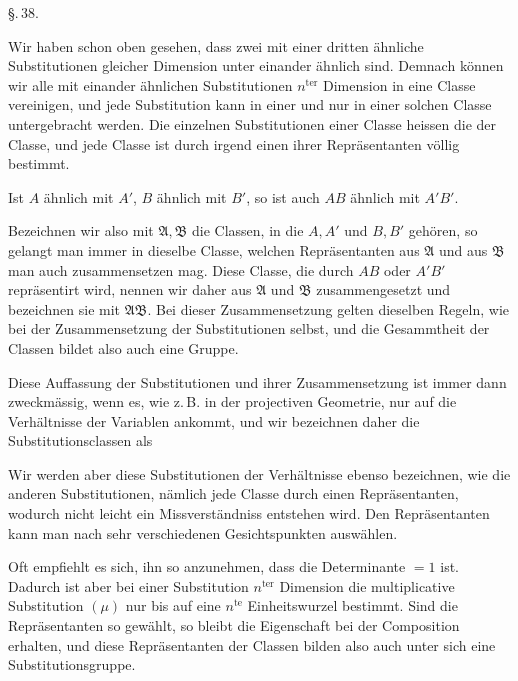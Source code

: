
\begin{center}
\S.\,38.

\end{center}

Wir haben schon oben gesehen, dass zwei mit einer dritten ähnliche Substitutionen gleicher Dimension unter einander ähnlich sind. Demnach können wir alle mit einander ähnlichen Substitutionen $n^{\mathrm{ter}}$ Dimension in eine Classe vereinigen, und jede Substitution kann in einer und nur in einer solchen Classe untergebracht werden. Die einzelnen Substitutionen einer Classe heissen die  der Classe, und jede Classe ist durch irgend einen ihrer Repräsentanten völlig bestimmt.

Ist $A$ ähnlich mit $A'$, $B$ ähnlich mit $B'$, so ist auch $AB$ ähnlich mit $A'B'$.

Bezeichnen wir also mit $\mathfrak{A}, \mathfrak{B}$ die Classen, in die $A, A'$ und $B, B'$ gehören, so gelangt man immer in dieselbe Classe, welchen Repräsentanten aus $\mathfrak{A}$ und aus $\mathfrak{B}$ man auch zusammensetzen mag. Diese Classe, die durch $AB$ oder $A'B'$ repräsentirt wird, nennen wir daher aus $\mathfrak{A}$ und $\mathfrak{B}$ zusammengesetzt und bezeichnen sie mit $\mathfrak{A}\mathfrak{B}$. Bei dieser Zusammensetzung gelten dieselben Regeln, wie bei der Zusammensetzung der Substitutionen selbst, und die Gesammtheit der Classen bildet also auch eine Gruppe.

Diese Auffassung der Substitutionen und ihrer Zusammensetzung ist immer dann zweckmässig, wenn es, wie z.\,B. in der projectiven Geometrie, nur auf die Verhältnisse der Variablen ankommt, und wir bezeichnen daher die Substitutionsclassen als 

Wir werden aber diese Substitutionen der Verhältnisse ebenso bezeichnen, wie die anderen Substitutionen, nämlich jede Classe durch einen Repräsentanten, wodurch nicht leicht ein Missverständniss entstehen wird. Den Repräsentanten kann man nach sehr verschiedenen Gesichtspunkten auswählen.

Oft empfiehlt es sich, ihn so anzunehmen, dass die Determinante $= 1$ ist. Dadurch ist aber bei einer Substitution $n^{\mathrm{ter}}$ Dimension die multiplicative Substitution $(\mu)$ nur bis auf eine $n^{\mathrm{te}}$ Einheitswurzel bestimmt. Sind die Repräsentanten so gewählt, so bleibt die Eigenschaft bei der Composition erhalten, und diese Repräsentanten der Classen bilden also auch unter sich eine Substitutionsgruppe.
